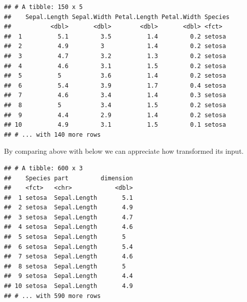 \documentclass[krantz2]{krantz}\usepackage{knitr}%
\begin{document}
\begin{knitrout}\footnotesize
{}\color{fgcolor}\begin{kframe}
\begin{alltt}
 \hlkwb{<-} 
\end{alltt}
\begin{verbatim}
## # A tibble: 150 x 5
##    Sepal.Length Sepal.Width Petal.Length Petal.Width Species
##           <dbl>       <dbl>        <dbl>       <dbl> <fct>  
##  1          5.1         3.5          1.4         0.2 setosa 
##  2          4.9         3            1.4         0.2 setosa 
##  3          4.7         3.2          1.3         0.2 setosa 
##  4          4.6         3.1          1.5         0.2 setosa 
##  5          5           3.6          1.4         0.2 setosa 
##  6          5.4         3.9          1.7         0.4 setosa 
##  7          4.6         3.4          1.4         0.3 setosa 
##  8          5           3.4          1.5         0.2 setosa 
##  9          4.4         2.9          1.4         0.2 setosa 
## 10          4.9         3.1          1.5         0.1 setosa 
## # ... with 140 more rows
\end{verbatim}
\end{kframe}
\end{knitrout}

By comparing  above with  below we can appreciate how  transformed its input.

\begin{knitrout}\footnotesize
{}\color{fgcolor}\begin{kframe}
\begin{alltt}
 \hlkwb{<-}      \hlopt{-}
\end{alltt}
\begin{verbatim}
## # A tibble: 600 x 3
##    Species part         dimension
##    <fct>   <chr>            <dbl>
##  1 setosa  Sepal.Length       5.1
##  2 setosa  Sepal.Length       4.9
##  3 setosa  Sepal.Length       4.7
##  4 setosa  Sepal.Length       4.6
##  5 setosa  Sepal.Length       5  
##  6 setosa  Sepal.Length       5.4
##  7 setosa  Sepal.Length       4.6
##  8 setosa  Sepal.Length       5  
##  9 setosa  Sepal.Length       4.4
## 10 setosa  Sepal.Length       4.9
## # ... with 590 more rows
\end{verbatim}
\end{kframe}
\end{knitrout}
\end{document}
